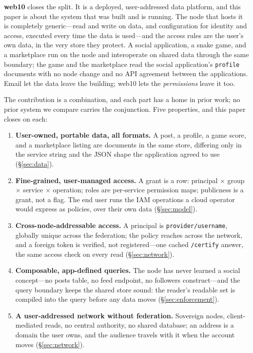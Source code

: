 \documentclass[sigconf, nonacm]{acmart}
\begin{document}
\textbf{web10} closes the split. It is a deployed, user-addressed data
platform, and this paper is about the system that was built and is running.
The node that hosts it is completely generic---read and write on data, and
configuration for identity and access, executed every time the data is
used---and the access rules are the user's own data, in the very store they
protect. A social application, a snake game, and a marketplace run on the
node and interoperate on shared data through the same boundary; the game and
the marketplace read the social application's \texttt{profile} documents
with no node change and no API agreement between the applications. Email
let the data leave the building; web10 lets the \emph{permissions} leave it
too.

The contribution is a combination, and each part has a home in prior work;
no prior system we compare carries the conjunction. Five properties, and
this paper closes on each:

\begin{enumerate}[leftmargin=*,nosep]
  \item \textbf{User-owned, portable data, all formats.} A post, a profile,
  a game score, and a marketplace listing are documents in the same store,
  differing only in the service string and the JSON shape the application
  agreed to use (\S\ref{sec:data}).
  \item \textbf{Fine-grained, user-managed access.} A grant is a row:
  principal $\times$ group $\times$ service $\times$ operation; roles are
  per-service permission maps; publicness is a grant, not a flag. The end
  user runs the IAM operations a cloud operator would express as policies,
  over their own data (\S\ref{sec:model}).
  \item \textbf{Cross-node-addressable access.} A principal is
  \texttt{provider/\allowbreak username}, globally unique across the
  federation; the policy reaches across the network, and a foreign token is
  verified, not registered---one cached \texttt{/certify} answer, the same
  access check on every read (\S\ref{sec:network}).
  \item \textbf{Composable, app-defined queries.} The node has never learned
  a social concept---no posts table, no feed endpoint, no followers
  construct---and the query boundary keeps the shared store sound: the
  reader's readable set is compiled into the query before any data moves
  (\S\ref{sec:enforcement}).
  \item \textbf{A user-addressed network without federation.} Sovereign
  nodes, client-mediated reads, no central authority, no shared database;
  an address is a domain the user owns, and the audience travels with it
  when the account moves (\S\ref{sec:network}).
\end{enumerate}
\end{document}

